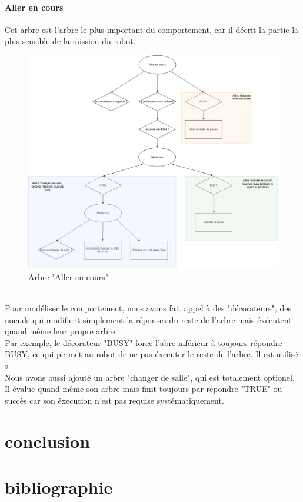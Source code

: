 \documentclass[titlepage]{article}
\begin{document}
	\paragraph{Aller en cours}
	Cet arbre est l'arbre le plus important du comportement, car il décrit la partie la plus sensible de la mission du robot.
	\begin{figure}[h!]
		\centering
		\includegraphics[width=\linewidth]{img/BT_5.png}
		\caption{Arbre "Aller en cours"}
		\label{fig:exemple_4}
	\end{figure}
	\\
	Pour modéliser le comportement, nous avons fait appel à des "décorateurs", des noeuds qui modifient simplement la réponses du reste de l'arbre mais éxécutent quand même leur propre arbre. 
	\\
	Par exemple, le décorateur "BUSY" force l'abre inférieur à toujours répondre BUSY, ce qui permet au robot de ne pas éxecuter le reste de l'arbre. Il est utilisé s
	\\
	Nous avons aussi ajouté un arbre "changer de salle", qui est totalement optionel. Il  évalue quand même son arbre mais finit toujours par répondre "TRUE" ou succès car son éxecution n'est pas requise systématiquement.
	
	\clearpage
	\section{conclusion}
	\clearpage
	\section{bibliographie}
	
	
	
\end{document}
